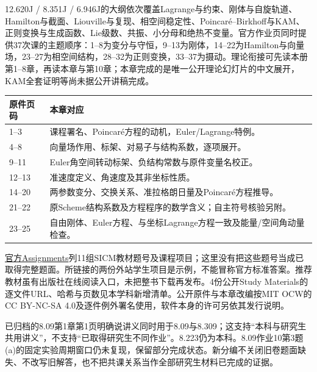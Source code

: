 12.620J / 8.351J / 6.946J的大纲依次覆盖Lagrange与约束、刚体与自旋轨道、Hamilton与截面、Liouville与复现、相空间稳定性、Poincaré--Birkhoff与KAM、正则变换与生成函数、Lie级数、共振、小分母和绝热不变量。官方作业页同时提供37次课的主题顺序：1--8为变分与守恒，9--13为刚体，14--22为Hamilton与向量场，23--27为相空间结构，28--32为正则变换，33--37为摄动。理论衔接可先读本册第1--8章，再读本章与第10章；本章完成的是唯一公开理论幻灯片的中文展开，KAM全套证明等尚未据公开讲稿完成。

\begin{longtable}{p{}p{}}
\toprule 原件页码 & 本章对应\\\midrule\endhead
1--3 & 课程署名、Poincaré方程的动机，Euler/Lagrange特例。\\
4--8 & 向量场作用、标架、对易子与结构系数，逐项展开。\\
9--11 & Euler角空间转动标架、负结构常数与原件变量名校正。\\
12--13 & 准速度定义、角速度及其非坐标性质。\\
14--20 & 两参数变分、交换关系、准拉格朗日量及Poincaré方程推导。\\
21--22 & 原Scheme结构系数及方程程序的数学含义；自主符号核验另附。\\
23--25 & 自由刚体、Euler方程、与坐标Lagrange方程一致及能量/空间角动量检查。\\
\bottomrule
\end{longtable}

\href{https://ocw.mit.edu/courses/12-620j-classical-mechanics-a-computational-approach-fall-2008/pages/assignments/}{官方Assignments}列11组SICM教材题号及课程项目；这里没有把这些题号当成已取得完整题面。所链接的两份外站学生项目是示例，不能冒称官方标准答案。推荐教材虽有出版社在线阅读入口，未把整书下载再发布。4份公开Study Materials的逐文件URL、哈希与页数见本学科新增清单。公开原件与本章改编按MIT OCW的CC BY-NC-SA 4.0及逐件例外署名使用，软件本身的许可另依其发行说明。

已归档的8.09第1章第1页明确说讲义同时用于8.09与8.309；这支持“本科与研究生共用讲义”，不支持“已取得研究生不同作业”。8.223仍为本科。8.09作业10第3题(a)的固定实验周期窗口仍未复现，保留部分完成状态。新分编不关闭旧卷题面缺失、不改写旧解答，也不把共课关系当作全部研究生材料已完成的证据。
